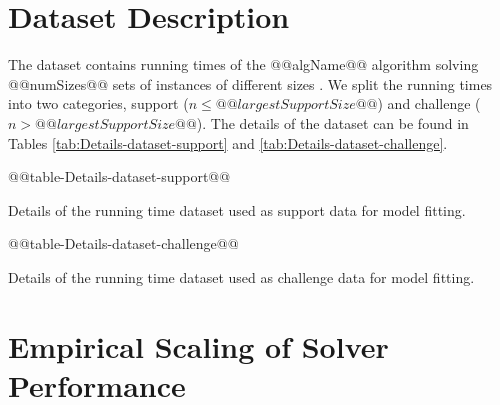 \section{Dataset Description}

The dataset contains running times of the @@algName@@ algorithm solving
@@numSizes@@ sets of instances of different sizes . We split the running times into
two categories, support ($n\leq@@largestSupportSize@@$) and challenge ($n>@@largestSupportSize@@$). The
details of the dataset can be found in Tables \ref{tab:Details-dataset-support} 
and \ref{tab:Details-dataset-challenge}.
\begin{table*}
\noindent \begin{centering}
@@table-Details-dataset-support@@
\par\end{centering}

\caption{\label{tab:Details-dataset-support} Details of the running time dataset used as support data for model fitting. }
\end{table*}

\begin{table*}
\noindent \begin{centering}
@@table-Details-dataset-challenge@@
\par\end{centering}

\caption{\label{tab:Details-dataset-challenge} Details of the running time dataset used as challenge data for model fitting. }
\end{table*}

% 
% 
% 
% 

\section{Empirical Scaling of Solver Performance}

